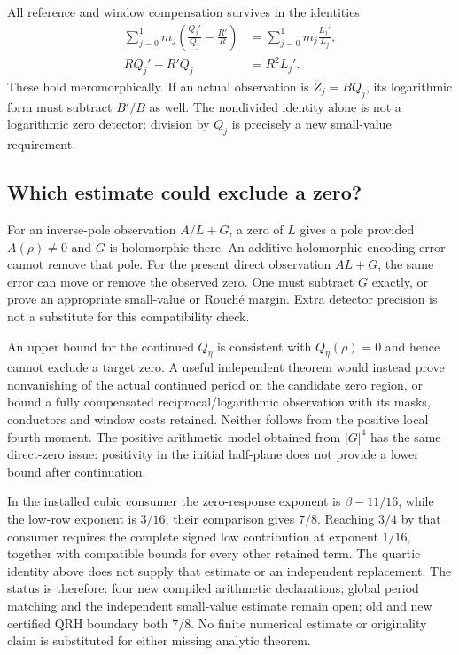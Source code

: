 \documentclass[11pt]{article}
\begin{document}
All reference and window compensation survives in the identities
\begin{align*}
 \sum_{j=0}^1m_j\left(\frac{Q_j'}{Q_j}-\frac{R'}R\right)
   &=\sum_{j=0}^1m_j\frac{L_j'}{L_j},\\
 RQ_j'-R'Q_j&=R^2L_j'.
\end{align*}
These hold meromorphically. If an actual observation is $Z_j=BQ_j$,
its logarithmic form must subtract $B'/B$ as well.
The nondivided identity alone is not a logarithmic zero detector:
division by $Q_j$ is precisely a new small-value requirement.

\subsection{Which estimate could exclude a zero?}
For an inverse-pole observation $A/L+G$, a zero of $L$ gives a pole
provided $A(\rho)\ne0$ and $G$ is holomorphic there. An additive
holomorphic encoding error cannot remove that pole. For the present
direct observation $AL+G$, the same error can move or remove the
observed zero. One must subtract $G$ exactly, or prove an appropriate
small-value or Rouch\'e margin. Extra detector precision is not a
substitute for this compatibility check.

An upper bound for the continued $Q_\eta$ is consistent with
$Q_\eta(\rho)=0$ and hence cannot exclude a target zero. A useful
independent theorem would instead prove nonvanishing of the actual
continued period on the candidate zero region, or bound a fully
compensated reciprocal/logarithmic observation with its masks,
conductors and window costs retained. Neither follows from the
positive local fourth moment. The positive arithmetic model obtained
from $|G|^4$ has the same direct-zero issue: positivity in the initial
half-plane does not provide a lower bound after continuation.

In the installed cubic consumer the zero-response exponent is
$\beta-11/16$, while the low-row exponent is $3/16$; their comparison
gives $7/8$. Reaching $3/4$ by that consumer requires the complete
signed low contribution at exponent $1/16$, together with compatible
bounds for every other retained term. The quartic identity above
does not supply that estimate or an independent replacement.
The status is therefore: four new compiled arithmetic declarations;
global period matching and the independent small-value estimate
remain open; old and new certified QRH boundary both $7/8$.
No finite numerical estimate or originality claim is substituted
for either missing analytic theorem.
\end{document}
